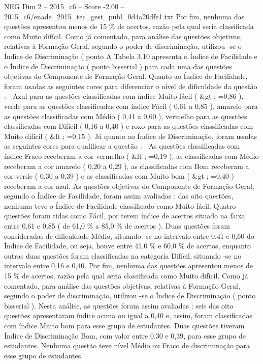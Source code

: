 \begin{textsample}{NEG Dim 2 – 2015\_c6 – Score -2.00 – 2015\_c6/enade\_2015\_tec\_gest\_publ\_0d4a20dfe1.txt}
Por fim, nenhuma das questões apresentou menos de 15 \% de acertos, razão pela qual seria classificada como Muito difícil.
Como já comentado, para análise das questões objetivas, relativas à Formação Geral, segundo o poder de discriminação, utilizou -se o Índice de Discriminação ( ponto A Tabela 3.10 apresenta o Índice de Facilidade e o Índice de Discriminação ( ponto bisserial ) para cada uma das questões objetivas do Componente de Formação Geral.
Quanto ao Índice de Facilidade, foram usadas as seguintes cores para diferenciar o nível de dificuldade da questão :  Azul para as questões classificadas com índice Muito fácil ( \&gt ; =0,86 ), verde para as questões classificadas com índice Fácil ( 0,61 a 0,85 ), amarelo para as questões classificadas com Médio ( 0,41 a 0,60 ), vermelho para as questões classificadas com Difícil ( 0,16 a 0,40 ) e roxo para as questões classificadas com Muito difícil ( \&lt ; =0,15 ).
Já quanto ao Índice de Discriminação, foram usadas as seguintes cores para qualificar a questão :  As questões classificadas com índice Fraco receberam a cor vermelho ( \&lt ; =0,19 ), as classificadas com Médio receberam a cor amarelo ( 0,20 a 0,29 ), as classificadas com Bom receberam a cor verde ( 0,30 a 0,39 ) e as classificadas com Muito bom ( \&gt ; =0,40 ) receberam a cor azul.
As questões objetivas do Componente de Formação Geral, segundo o Índice de Facilidade, foram assim avaliadas : das oito questões, nenhuma teve o Índice de Facilidade classificado como Muito fácil.
Quatro questões foram tidas como Fácil, por terem índice de acertos situado na faixa entre 0,61 e 0,85 ( de 61,0 \% a 85,0 \% de acertos ).
Duas questões foram consideradas de dificuldade Médio, situando -se no intervalo entre 0,41 e 0,60 do Índice de Facilidade, ou seja, houve entre 41,0 \% e 60,0 \% de acertos, enquanto outras duas questões foram classificadas na categoria Difícil, situando -se no intervalo entre 0,16 e 0,40.
Por fim, nenhuma das questões apresentou menos de 15 \% de acertos, razão pela qual seria classificada como Muito difícil.
Como já comentado, para análise das questões objetivas, relativas à Formação Geral, segundo o poder de discriminação, utilizou -se o Índice de Discriminação ( ponto bisserial ).
Nesta análise, as questões foram assim avaliadas : seis das oito questões apresentaram índice acima ou igual a 0,40 e, assim, foram classificadas com índice Muito bom para esse grupo de estudantes.
Duas questões tiveram Índice de Discriminação Bom, com valor entre 0,30 e 0,39, para esse grupo de estudantes.
Nenhuma questão teve nível Médio ou Fraco de discriminação para esse grupo de estudantes.

\end{textsample}
